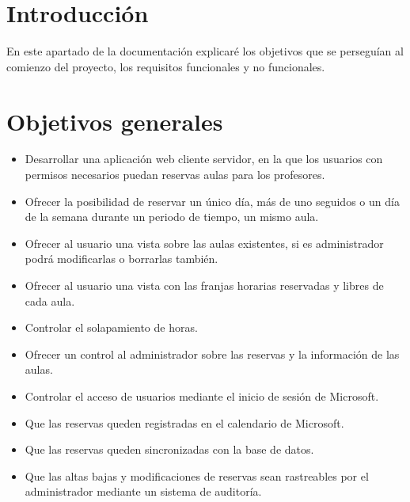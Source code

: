 
\section{Introducción}
En este apartado de la documentación explicaré  los objetivos que se perseguían al comienzo del proyecto, los requisitos funcionales y no funcionales.
\section{Objetivos generales}
\begin{itemize}
	\item Desarrollar una aplicación web cliente servidor, en la que los usuarios con permisos necesarios puedan reservas aulas para los profesores.
	\item Ofrecer la posibilidad de reservar un único día, más de uno seguidos o un día de la semana durante un periodo de tiempo, un mismo aula.
	\item Ofrecer al usuario una vista sobre las aulas existentes, si es administrador podrá modificarlas o borrarlas también.
	\item Ofrecer al usuario una vista con las franjas horarias reservadas y libres de cada aula.
	\item Controlar el solapamiento de horas.
	\item Ofrecer un control al administrador sobre las reservas y la información de las aulas.
	\item Controlar el acceso de usuarios mediante el inicio de sesión de Microsoft.
	\item Que las reservas queden registradas en el calendario de Microsoft.
	\item Que las reservas queden sincronizadas con la base de datos.
	\item Que las altas bajas y modificaciones de reservas sean rastreables por el administrador mediante un sistema de auditoría.
\end{itemize}

